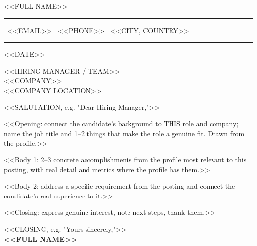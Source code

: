 \documentclass[a4paper,11pt]{article}
\begin{document}
\begin{center}
  {\Huge\color{accentTitle} <<FULL NAME>>}\\[9pt]
  {\color{accentLine}\hrule}
  \vspace{4pt}
  \footnotesize
  \faEnvelope\ \href{mailto:<<EMAIL>>}{<<EMAIL>>} \quad\textbullet\quad
  \faPhone\ <<PHONE>> \quad\textbullet\quad
  \faMapMarker*\ <<CITY, COUNTRY>>
  \vspace{4pt}
  {\color{accentLine}\hrule}
\end{center}

\vspace{6pt}

<<DATE>>
\vspace{2pt}

<<HIRING MANAGER / TEAM>>\\
<<COMPANY>>\\
<<COMPANY LOCATION>>

\vspace{4pt}
<<SALUTATION, e.g. "Dear Hiring Manager,">>

\justifying

<<Opening: connect the candidate's background to THIS role and company; name the job
title and 1–2 things that make the role a genuine fit. Drawn from the profile.>>

<<Body 1: 2–3 concrete accomplishments from the profile most relevant to this posting,
with real detail and metrics where the profile has them.>>

<<Body 2: address a specific requirement from the posting and connect the candidate's
real experience to it.>>

<<Closing: express genuine interest, note next steps, thank them.>>

\vspace{10pt}
<<CLOSING, e.g. "Yours sincerely,">>\\[6pt]
\textbf{<<FULL NAME>>}
\end{document}
